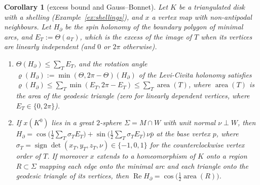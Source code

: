 \documentclass[11pt,reqno]{amsart}
\newtheorem{corollary}[theorem]{Corollary}
\theoremstyle{definition}
\theoremstyle{remark}
\numberwithin{equation}{section}
\newcommand{\re}{\operatorname{Re}}
\begin{document}
\begin{corollary}[excess bound and Gauss--Bonnet]\label{cor:excess}
Let $K$ be a triangulated disk with a shelling (Example~\ref{ex:shellings}), and $x$ a
vertex map with non-antipodal neighbours.  Let $H_\partial$ be the spin holonomy of the boundary polygon of
minimal arcs, and $E_T:=\Theta(a_T)$, which is the excess of the image of $T$ when its vertices are linearly
independent (and $0$ or $2\pi$ otherwise).
\begin{enumerate}[label=(\roman*)]
\item $\Theta(H_\partial)\le\sum_TE_T$, and the rotation angle $\varrho(H_\partial):=\min(\Theta,2\pi-\Theta)(H_\partial)$ of the Levi-Civita
holonomy satisfies $\varrho(H_\partial)\le\sum_T\min(E_T,2\pi-E_T)\le\sum_T\operatorname{area}(T)$, where $\operatorname{area}(T)$ is the
area of the geodesic triangle (zero for linearly dependent vertices, where $E_T\in\{0,2\pi\}$).
\item If $x(K^0)$ lies in a great $2$-sphere $\Sigma=M\cap W$ with unit normal $\nu\perp W$, then
$H_\partial=\cos\bigl(\tfrac12\sum_T\sigma_TE_T\bigr)+\sin\bigl(\tfrac12\sum_T\sigma_TE_T\bigr)\,\nu\bar p$ at the base vertex
$p$, where $\sigma_T=\operatorname{sign}\det(x_T,y_T,z_T,\nu)\in\{-1,0,1\}$ for the counterclockwise vertex order of $T$.
If moreover $x$ extends to a homeomorphism of $K$ onto a region $R\subset\Sigma$ mapping each edge onto the minimal arc
and each triangle onto the geodesic triangle of its vertices, then $\re H_\partial=\cos\bigl(\tfrac12\operatorname{area}(R)\bigr)$.
\end{enumerate}
\end{corollary}
\end{document}
